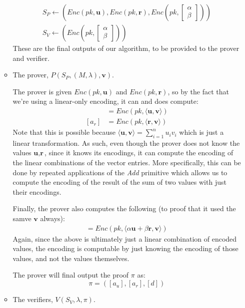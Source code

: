 \documentclass[12pt]{exam}
\begin{document}
\begin{questions}
\begin{solution}
\begin{enumerate}[label=\textbf{\alph*.}]
\begin{itemize}
        \begin{align*}
          S_P \leftarrow \left(\textit{Enc}(pk, \textbf{u}), \textit{Enc}(pk, \textbf{r}), \textit{Enc}\left(pk, \begin{bmatrix} \alpha \\ \beta \end{bmatrix}\right)\right) \\
          S_V \leftarrow \left( \textit{Enc}\left(pk, \begin{bmatrix} \alpha \\ \beta \end{bmatrix} \right) \right)
        \end{align*}
        These are the final outputs of our algorithm, to be provided to the prover and verifier.

      \item The prover, $P(S_P, (M, \lambda), \textbf{v})$.

      The prover is given $\textit{Enc}(pk, \textbf{u})$ and $\textit{Enc}(pk, \textbf{r})$, so by the fact that we're using a linear-only encoding, it can and does compute:
      \begin{align*}
        [a_u] &= \textit{Enc}(pk, \langle \textbf{u}, \textbf{v} \rangle) \\
        [a_r] &= \textit{Enc}(pk, \langle \textbf{r}, \textbf{v} \rangle)
      \end{align*}
      Note that this is possible because $\langle \textbf{u}, \textbf{v} \rangle = \sum_{i=1}^n u_i v_i$ which is just a linear transformation. As such, even though the prover does not know the values $\textbf{u}, \textbf{r}$, since it knows its encodings, it can compute the encoding of the linear combinations of the vector entries. More specifically, this can be done by repeated applications of the \textit{Add} primitive which allows us to compute the encoding of the result of the sum of two values with just their encodings.

      Finally, the prover also computes the following (to proof that it used the samve $\textbf{v}$ always):
      \begin{align*}
        [d] = \textit{Enc}(pk, \langle \alpha \textbf{u} + \beta \textbf{r}, \textbf{v} \rangle)
      \end{align*}
      Again, since the above is ultimately just a linear combination of encoded values, the encoding is computable by just knowing the encoding of those values, and not the values themselves.

      The prover will final output the proof $\pi$ as:
      \[
        \pi = ([a_u], [a_r], [d])
      \]
      \item The verifiers, $V(S_V, \lambda, \pi)$.


\end{itemize}
\end{enumerate}
\end{solution}
\end{questions}
\end{document}
